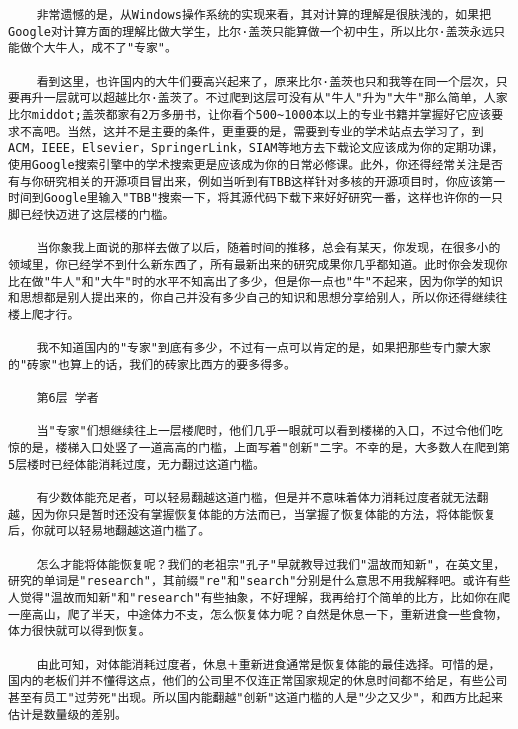 \begin{verbatim}
    非常遗憾的是，从Windows操作系统的实现来看，其对计算的理解是很肤浅的，如果把Google对计算方面的理解比做大学生，比尔·盖茨只能算做一个初中生，所以比尔·盖茨永远只能做个大牛人，成不了"专家"。

    看到这里，也许国内的大牛们要高兴起来了，原来比尔·盖茨也只和我等在同一个层次，只要再升一层就可以超越比尔·盖茨了。不过爬到这层可没有从"牛人"升为"大牛"那么简单，人家比尔middot;盖茨都家有2万多册书，让你看个500~1000本以上的专业书籍并掌握好它应该要求不高吧。当然，这并不是主要的条件，更重要的是，需要到专业的学术站点去学习了，到ACM，IEEE，Elsevier，SpringerLink，SIAM等地方去下载论文应该成为你的定期功课，使用Google搜索引擎中的学术搜索更是应该成为你的日常必修课。此外，你还得经常关注是否有与你研究相关的开源项目冒出来，例如当听到有TBB这样针对多核的开源项目时，你应该第一时间到Google里输入"TBB"搜索一下，将其源代码下载下来好好研究一番，这样也许你的一只脚已经快迈进了这层楼的门槛。

    当你象我上面说的那样去做了以后，随着时间的推移，总会有某天，你发现，在很多小的领域里，你已经学不到什么新东西了，所有最新出来的研究成果你几乎都知道。此时你会发现你比在做"牛人"和"大牛"时的水平不知高出了多少，但是你一点也"牛"不起来，因为你学的知识和思想都是别人提出来的，你自己并没有多少自己的知识和思想分享给别人，所以你还得继续往楼上爬才行。

    我不知道国内的"专家"到底有多少，不过有一点可以肯定的是，如果把那些专门蒙大家的"砖家"也算上的话，我们的砖家比西方的要多得多。

    第6层 学者

    当"专家"们想继续往上一层楼爬时，他们几乎一眼就可以看到楼梯的入口，不过令他们吃惊的是，楼梯入口处竖了一道高高的门槛，上面写着"创新"二字。不幸的是，大多数人在爬到第5层楼时已经体能消耗过度，无力翻过这道门槛。

    有少数体能充足者，可以轻易翻越这道门槛，但是并不意味着体力消耗过度者就无法翻越，因为你只是暂时还没有掌握恢复体能的方法而已，当掌握了恢复体能的方法，将体能恢复后，你就可以轻易地翻越这道门槛了。

    怎么才能将体能恢复呢？我们的老祖宗"孔子"早就教导过我们"温故而知新"，在英文里，研究的单词是"research"，其前缀"re"和"search"分别是什么意思不用我解释吧。或许有些人觉得"温故而知新"和"research"有些抽象，不好理解，我再给打个简单的比方，比如你在爬一座高山，爬了半天，中途体力不支，怎么恢复体力呢？自然是休息一下，重新进食一些食物，体力很快就可以得到恢复。

    由此可知，对体能消耗过度者，休息＋重新进食通常是恢复体能的最佳选择。可惜的是，国内的老板们并不懂得这点，他们的公司里不仅连正常国家规定的休息时间都不给足，有些公司甚至有员工"过劳死"出现。所以国内能翻越"创新"这道门槛的人是"少之又少"，和西方比起来估计是数量级的差别。


\end{verbatim}
